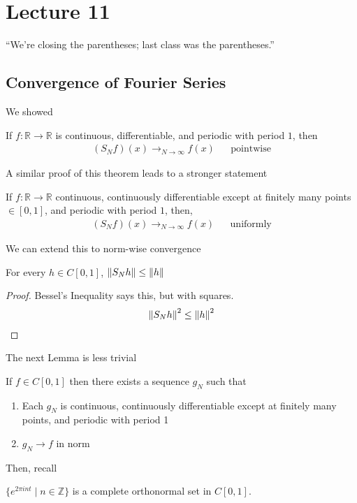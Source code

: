 \section{Lecture 11}
``We're closing the parentheses; last class was the parentheses.''

\subsection{Convergence of Fourier Series}
We showed
\begin{lemma}
    If $f: \mathbb{R} \to \mathbb{R}$ is continuous, differentiable, and periodic with period $1$, then
    \begin{align}
        (S_Nf)(x) \to_{N \to \infty} f(x) && \text{pointwise}
    \end{align}
\end{lemma}
A similar proof of this theorem leads to a stronger statement
\begin{lemma}
    If $f: \mathbb{R} \to \mathbb{R}$ continuous, continuously differentiable except at finitely many points $\in [0,1]$, and periodic with period $1$, then,
    \begin{align}
        (S_Nf)(x) \to_{N\to\infty} f(x) && \text{uniformly}
    \end{align}
\end{lemma}
We can extend this to norm-wise convergence
\begin{lemma}
    For every $h \in C[0,1]$, $\norm{S_Nh} \le \norm{h}$
    \begin{proof}
        Bessel's Inequality says this, but with squares.
        \begin{align}
            \norm{S_Nh}^2 \le \norm{h}^2
        \end{align}
    \end{proof}
\end{lemma}
The next Lemma is less trivial
\begin{lemma}
    If $f \in C[0,1]$ then there exists a sequence $g_N$ such that
    \begin{enumerate}
        \item Each $g_N$ is continuous, continuously differentiable except at finitely many points, and periodic with period 1
        \item $g_N \to f$ in norm
    \end{enumerate}
\end{lemma}
Then, recall
\begin{theorem}
    $\{ e^{2\pi int} \mid n \in \mathbb{Z} \}$ is a complete orthonormal set in $C[0,1]$.
\end{theorem}
